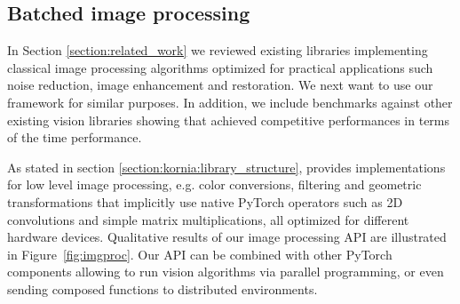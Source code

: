 \subsection{Batched image processing}
\label{section:use_cases:imgproc}

In Section \ref{section:related_work} we reviewed existing libraries implementing classical image processing algorithms optimized for practical applications such noise reduction, image enhancement and restoration. We next  want to use our framework for similar purposes. In addition, we include benchmarks against other existing vision libraries showing that \lib{} achieved competitive performances in terms of the time performance.

As stated in section \ref{section:kornia:library_structure}, \lib{} provides implementations for low level image processing, e.g. color conversions, filtering and geometric   transformations that implicitly use native PyTorch operators such as 2D convolutions and simple matrix multiplications,  all  optimized for different hardware devices. Qualitative results of our image processing API are illustrated in Figure~\ref{fig:imgproc}. Our API can be combined with other PyTorch components allowing to run vision algorithms via parallel programming, or even sending composed functions to distributed environments.

